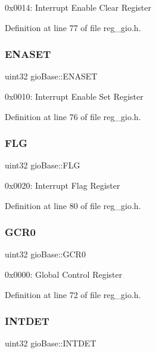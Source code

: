 0x0014\+: Interrupt Enable Clear Register 

Definition at line 77 of file reg\+\_\+gio.\+h.

\mbox{\label{structgioBase_a51bcd1e7d79ecb2020513014b73cd9d2}} 
\subsubsection{\texorpdfstring{E\+N\+A\+S\+ET}{ENASET}}
{\footnotesize\ttfamily uint32 gio\+Base\+::\+E\+N\+A\+S\+ET}

0x0010\+: Interrupt Enable Set Register 

Definition at line 76 of file reg\+\_\+gio.\+h.

\mbox{\label{structgioBase_a2110fd9de00d8a94ed80324e200994f7}} 
\subsubsection{\texorpdfstring{F\+LG}{FLG}}
{\footnotesize\ttfamily uint32 gio\+Base\+::\+F\+LG}

0x0020\+: Interrupt Flag Register 

Definition at line 80 of file reg\+\_\+gio.\+h.

\mbox{\label{structgioBase_aaba8cfd4fd45b38729fc0eb9c594c481}} 
\subsubsection{\texorpdfstring{G\+C\+R0}{GCR0}}
{\footnotesize\ttfamily uint32 gio\+Base\+::\+G\+C\+R0}

0x0000\+: Global Control Register 

Definition at line 72 of file reg\+\_\+gio.\+h.

\mbox{\label{structgioBase_a972632ec99052df535f1a88cbc7a88c6}} 
\subsubsection{\texorpdfstring{I\+N\+T\+D\+ET}{INTDET}}
{\footnotesize\ttfamily uint32 gio\+Base\+::\+I\+N\+T\+D\+ET}

